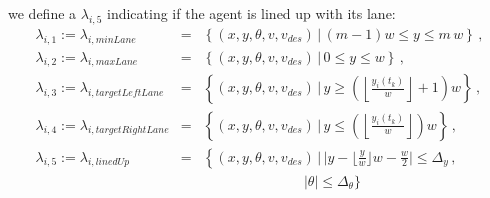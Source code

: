 we define a $\lambda_{i, 5}$ indicating if the agent is lined up with its lane:
\begin{equation*}
\begin{array}{rcl}
\lambda_{i,1} := \lambda_{i, minLane} & = & \left\lbrace (x,y,\theta, v, v_{des}) \, | \, (m-1) w \leq y \leq m \, w \right\rbrace \, , \\
%
\lambda_{i,2} := \lambda_{i, maxLane} & = & \left\lbrace (x,y,\theta, v, v_{des}) \, | \, 0 \leq y \leq w \right\rbrace \, , \\
%
\lambda_{i,3} := \lambda_{i, targetLeftLane} & = & \left\lbrace (x,y,\theta, v, v_{des}) \, | \, y \geq \left( \left\lfloor \frac{y_i(t_k)}{w} \right\rfloor + 1 \right) w \right\rbrace \, , \\
%
\lambda_{i,4} := \lambda_{i, targetRightLane} & = & \left\lbrace (x,y,\theta, v, v_{des}) \, | \, y \leq \left( \left\lfloor \frac{y_i(t_k)}{w} \right\rfloor \right) w \right\rbrace \, , \\
%
\lambda_{i,5} := \lambda_{i, linedUp} & = & \left\lbrace (x,y,\theta, v, v_{des}) \, | \, |y - \lfloor \frac{y}{w} \rfloor w - \frac{w}{2} | \leq \Delta_y \right. \, , \\ 
& & \;\;\;\;\;\;\;\;\;\;\;\;\;\;\;\;\;\;\;\;\;\;\;\;\;\; 
|\theta| \leq \Delta_{\theta}  \rbrace \\

\end{array}
\end{equation*}

